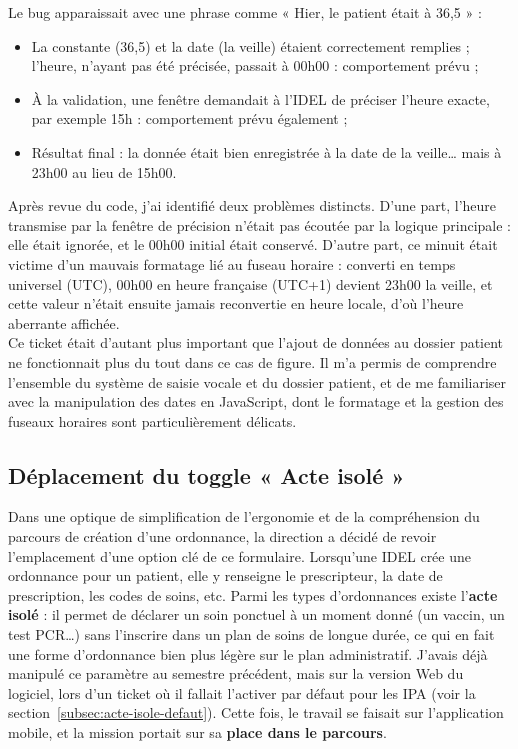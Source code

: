\documentclass{article}
\begin{document}
Le bug apparaissait avec une phrase comme « Hier, le patient était à 36,5 » :

\begin{itemize}
    \item La constante (36,5) et la date (la veille) étaient correctement remplies ; l'heure, n'ayant pas été précisée, passait à 00h00 : comportement prévu ;
    \item À la validation, une fenêtre demandait à l'IDEL de préciser l'heure exacte, par exemple 15h : comportement prévu également ;
    \item Résultat final : la donnée était bien enregistrée à la date de la veille\ldots{} mais à 23h00 au lieu de 15h00.
\end{itemize}

Après revue du code, j'ai identifié deux problèmes distincts. D'une part, l'heure transmise par la fenêtre de précision n'était pas écoutée par la logique principale : elle était ignorée, et le 00h00 initial était conservé. D'autre part, ce minuit était victime d'un mauvais formatage lié au fuseau horaire : converti en temps universel (UTC), 00h00 en heure française (UTC+1) devient 23h00 la veille, et cette valeur n'était ensuite jamais reconvertie en heure locale, d'où l'heure aberrante affichée.\\

Ce ticket était d'autant plus important que l'ajout de données au dossier patient ne fonctionnait plus du tout dans ce cas de figure. Il m'a permis de comprendre l'ensemble du système de saisie vocale et du dossier patient, et de me familiariser avec la manipulation des dates en JavaScript, dont le formatage et la gestion des fuseaux horaires sont particulièrement délicats.

\subsection{Déplacement du toggle « Acte isolé »}

Dans une optique de simplification de l'ergonomie et de la compréhension du parcours de création d'une ordonnance, la direction a décidé de revoir l'emplacement d'une option clé de ce formulaire. Lorsqu'une IDEL crée une ordonnance pour un patient, elle y renseigne le prescripteur, la date de prescription, les codes de soins, etc. Parmi les types d'ordonnances existe l'\textbf{acte isolé} : il permet de déclarer un soin ponctuel à un moment donné (un vaccin, un test PCR\ldots) sans l'inscrire dans un plan de soins de longue durée, ce qui en fait une forme d'ordonnance bien plus légère sur le plan administratif. J'avais déjà manipulé ce paramètre au semestre précédent, mais sur la version Web du logiciel, lors d'un ticket où il fallait l'activer par défaut pour les IPA (voir la section~\ref{subsec:acte-isole-defaut}). Cette fois, le travail se faisait sur l'application mobile, et la mission portait sur sa \textbf{place dans le parcours}.\\
\end{document}
